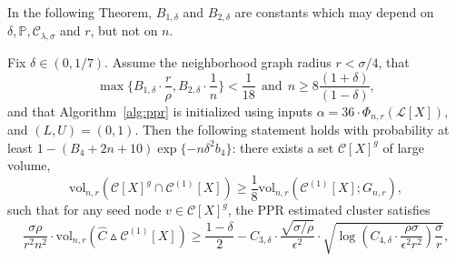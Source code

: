 \documentclass[twoside,11pt]{article}
\newcommand{\1}{\mathbf{1}}
\newcommand{\mc}[1]{\mathcal{#1}}
\newcommand{\Pbb}{\mathbb{P}}
\newcommand{\wh}[1]{\widehat{#1}}
\newcommand{\vol}{\mathrm{vol}}
\begin{document}
In the following Theorem, $B_{1,\delta}$ and $B_{2,\delta}$ are constants which may depend on $\delta,\Pbb,\mc{C}_{\lambda,\sigma}$ and $r$, but not on $n$.
\begin{theorem}
	\label{thm:ppr_lb}
	Fix $\delta \in (0,1/7)$. Assume the neighborhood graph radius $r < \sigma/4$, that
	\begin{equation}
	\label{eqn:ppr_lb_condition}
	\max\biggl\{ B_{1,\delta} \cdot \frac{r}{\rho}, B_{2,\delta} \cdot \frac{1}{n} \biggr\} < \frac{1}{18}~~\text{and}~~n \geq 8 \frac{(1 + \delta)}{(1 - \delta)},
	\end{equation} 
	and that Algorithm~\ref{alg:ppr} is initialized using inputs $\alpha = 36 \cdot \Phi_{n,r}(\mc{L}[X])$, and $(L,U) = (0,1)$.  Then the following statement holds with probability at least $1 - (B_4 + 2n + 10)\exp\{-n\delta^2 b_4\}$: there exists a set $\mc{C}[X]^g$ of large volume, 
	$$
	\vol_{n,r}(\mc{C}[X]^g \cap \mc{C}^{(1)}[X]) \geq \frac{1}{8} \vol_{n,r}(\mc{C}^{(1)}[X];G_{n,r}),
	$$
	such that for any seed node $v \in \mc{C}[X]^g$, the PPR estimated cluster
	\smash{$\wh{C}$} satisfies    
	\begin{equation}
	\label{eqn:ppr_lb}
	\frac{\sigma \rho}{r^2 n^2} \cdot \vol_{n,r}(\wh{C} \vartriangle \mc{C}^{(1)}[X]) \geq \frac{1 - \delta}{2} -  C_{3,\delta} \cdot \frac{\sqrt{\sigma/\rho}}{\epsilon^2} \cdot \sqrt{ \log\left(C_{4,\delta} \cdot \frac{\rho \sigma}{\epsilon^2 r^2}\right) \frac{\sigma}{r}},   
	\end{equation} 
\end{theorem}
\end{document}
